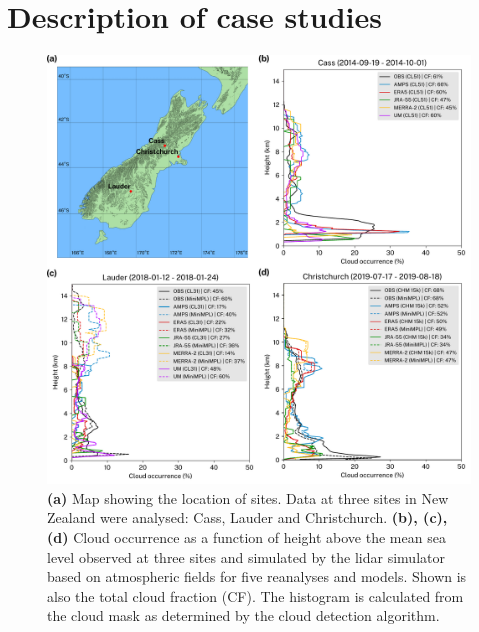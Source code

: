 \section{Description of case studies}
\label{sec:3:case-studies}

\begin{figure}[p]
\centerline{\includegraphics[width=1.12\textwidth]{chapter3/fig/case_studies_rev2.pdf}}
\caption[Map showing the location of sites and cloud occurrence as a function of height]{
\textbf{(a)}
Map showing the location of sites. Data at three sites in New Zealand
were analysed: Cass, Lauder and Christchurch.
\textbf{(b), (c), (d)}
Cloud occurrence as a function of height above the mean sea level
observed at three sites and simulated by the lidar simulator based on atmospheric
fields for five reanalyses and models. Shown is also the total cloud fraction (CF).
The histogram is calculated from the cloud mask as determined by the cloud
detection algorithm.
}
\label{fig:3:case-studies}
\end{figure}

